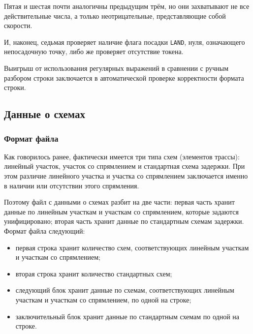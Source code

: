 \documentclass[12pt]{article}
\theoremstyle{plain}
\begin{document}
Пятая и шестая почти аналогичны предыдущим трём, но они захватывают не все действительные числа, а только неотрицательные, представляющие собой скорости.

И, наконец, седьмая проверяет наличие флага посадки \texttt{LAND}, нуля, означающего непосадочную точку, либо же проверяет отсутствие токена. 

Выигрыш от использования регулярных выражений в сравнении с ручным разбором строки заключается в автоматической проверке корректности формата строки.


\subsection{Данные о схемах}

\subsubsection{Формат файла}

Как говорилось ранее, фактически имеется три типа схем (элементов трассы): линейный участок, участок со спрямлением и стандартная схема задержки. При этом различие линейного участка и участка со спрямлением заключается именно в наличии или отсутствии этого спрямления. 

Поэтому файл с данными о схемах разбит на две части: первая часть хранит данные по линейным участкам и участкам со спрямлением, которые задаются унифицировано; вторая часть хранит данные по стандартным схемам задержки. Формат файла следующий:

\begin{itemize}[topsep=-0.5\parsep,itemsep=-0.5\parsep]
  \item первая строка хранит количество схем, соответствующих линейным участкам и участкам со спрямлением;
  \item вторая строка хранит количество стандартных схем;
  \item следующий блок хранит данные по схемам, соответствующих линейным участкам и участкам со спрямлением, по одной на строке;
  \item заключительный блок хранит данные по стандартным схемам по одной на строке.
\end{itemize}
\end{document}

